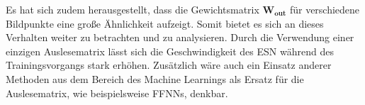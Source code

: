 Es hat sich zudem herausgestellt, dass die Gewichtsmatrix $\mathbf{W_{out}}$ für verschiedene Bildpunkte eine große Ähnlichkeit aufzeigt. Somit bietet es sich an dieses Verhalten weiter zu betrachten und zu analysieren. Durch die Verwendung einer einzigen Auslesematrix lässt sich die Geschwindigkeit des \textsc{ESN} während des Trainingsvorgangs stark erhöhen. Zusätzlich wäre auch ein Einsatz anderer Methoden aus dem Bereich des Machine Learnings als Ersatz für die Auslesematrix, wie beispielsweise \textsc{FFNN}s, denkbar.  